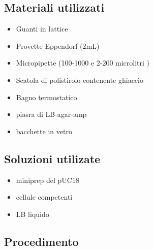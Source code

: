  
\subsection{Materiali utilizzati}

\begin{itemize}
	\item Guanti in lattice 
	\item Provette Eppendorf (2mL)
	\item Micropipette (100-1000  e 2-200 microlitri  )
	\item Scatola di polistirolo contenente ghiaccio
	\item Bagno termostatico
	\item piasra di LB-agar-amp
	\item bacchette in vetro 
\end{itemize}


\subsection{Soluzioni utilizate}

\begin{itemize}

	\item miniprep del pUC18
	\item cellule competenti 
	\item LB liquido 

\end{itemize}



\subsection{Procedimento}

